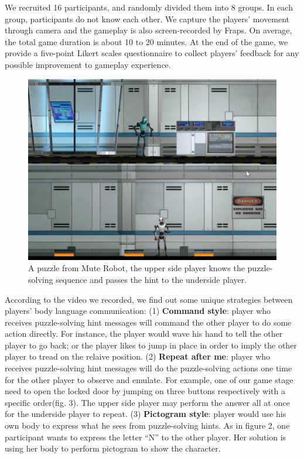 \documentclass{chi-ext}
\begin{document}
We recruited 16 participants, and randomly divided them into 8 groups. In each group, participants do not know each other. We capture the players' movement through camera and the gameplay is also screen-recorded by Fraps\cite{Fraps}.
On average, the total game duration is about 10 to 20 minutes. 
At the end of the game, we provide a five-point Likert scales questionnaire to 
collect players' feedback for any possible improvement to gameplay experience.

\begin{figure}
  \centering
  \includegraphics[width=0.8\linewidth]{figures/Figure2.jpg}
  \caption{A puzzle from Mute Robot, the upper side player knows the puzzle-solving sequence and passes the hint to the underside player.}
  \label{fig:Figure2}
\end{figure}

According to the video we recorded, we find out some unique strategies between players' body language communication: 
(1) {\bf Command style}: player who receives puzzle-solving hint messages will command the other player to do some action directly. For instance, the player would wave his hand to tell the other player to go back; or the player likes to jump in place in order to imply the other player to tread on the relaive position.
(2) {\bf Repeat after me}: player who receives puzzle-solving hint messages will do the puzzle-solving actions one time for the other player to observe and emulate. For example, one of our game stage need to open the locked door by jumping on three buttons respectively with a specific order(fig. 3). The upper side player may perform the answer all at once for the underside player to repeat.
(3) {\bf Pictogram style}: player would use his own body to express what he sees from puzzle-solving hints. As in figure 2, one participant wants to express the letter ``N'' to the other player. Her solution is using her body to perform pictogram to show the character.
\end{document}
